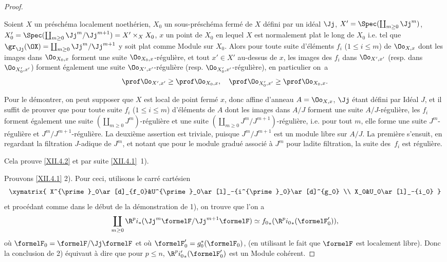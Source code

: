 \begin{proof}
\begin{lemme} \label{XII.4.2}
Soient $X$ un pr\'esch\'ema localement noeth\'erien, $X_0$ un sous-pr\'esch\'ema ferm\'e de $X$ d\'efini par un id\'eal $\Jj$, $X'=\Spec(\coprod_{m\geq 0} \Jj^m)$, $X_0'=\Spec(\coprod_{m\geq 0} \Jj^m/\Jj^{m+1}) = X'\times_XX_0$, $x$ un point de $X_0$ en lequel $X$ est normalement plat le long de $X_0$ i.e. tel que $\gr_{\Jj}(\OX)= \coprod_{m\geq 0}\Jj^m/\Jj^{m+1}$ y soit plat comme Module sur $X_0$. Alors pour toute suite d'\'el\'ements $f_i$ ($1\leq i\leq m$) de $\Oo_{X, x}$ dont les images dans $\Oo_{X_0, x}$ forment une suite $\Oo_{X_0, x}$-r\'eguli\`ere, et tout $x'\in X'$ au-dessus de $x$, les images des $f_i$ dans $\Oo_{X', x'}$ (resp. dans $\Oo_{X'_0, x'}$) forment \'egalement une suite $\Oo_{X', x'}$-r\'eguli\`ere (resp. $\Oo_{X'_0, x'}$-r\'eguli\`ere), en particulier on~a
\steco
\begin{equation} \label{eq:XII.23}
\prof \Oo_{X', x'} \geq \prof \Oo_{X_0, x}, \quad \prof \Oo_{X'_0, x'} \geq \prof \Oo_{X_0, x}.
\end{equation}
\end{lemme}

Pour le d\'emontrer, on peut supposer que $X$ est local de point ferm\'e $x$, donc affine d'anneau $A=\Oo_{X, x}$, $\Jj$ \'etant d\'efini par Id\'eal $J$, et il suffit de prouver que pour toute suite $f_i$ ($1\leq i\leq m$) d'\'el\'ements de $A$ dont les images dans $A/J$ forment une suite $A/J$-r\'eguli\`ere, les $f_i$ forment \'egalement une suite $(\coprod_{m\geq 0} J^m)$-r\'eguli\`ere et une suite $(\coprod_{m\geq 0} J^m/J^{m+1})$-r\'eguli\`ere, i.e. pour tout $m$, elle forme une suite $J^m$-r\'eguli\`ere et $J^m/J^{m+1}$-r\'eguli\`ere. La deuxi\`eme assertion est triviale, puisque $J^m/J^{m+1}$ est un module libre sur $A/J$. La premi\`ere s'ensuit, en regardant la filtration $J$-adique de $J^m$, et notant que pour le module gradu\'e associ\'e \`a $J^m$ pour ladite filtration, la suite des~$f_i$ est r\'eguli\`ere.

Cela prouve \ref{XII.4.2} et par suite \ref{XII.4.1}~1\noo).

Prouvons \ref{XII.4.1} 2\noo). Pour ceci, utilisons le carr\'e cart\'esien
\[
\xymatrix{
X^{\prime}_0\ar[d]_{f_0}&U^{\prime}_0\ar[l]_-{i^{\prime}_0}\ar[d]^{g_0} \\
X_0&U_0\ar[l]_-{i_0}
}
\]
et proc\'edant comme dans le d\'ebut de la d\'emonstration de 1\noo), on trouve que l'on a
\steco
\begin{equation} \label{eq:XII.24}
\coprod_{m\geq 0} \R^pi_\ast(\Jj^m\formelF/\Jj^{m+1}\formelF) \simeq {f_0}_\ast (\R^p{i_0}_\ast(\formelF_0')),
\end{equation}
o\`u $\formelF_0=\formelF/\Jj\formelF$ et o\`u $\formelF_0'=g_0^\ast(\formelF_0)$, (en utilisant le fait que $\formelF$ est localement libre). Donc la conclusion de 2\noo) \'equivaut \`a dire que pour $p\leq n$, $\R^p{i'_0}_\ast(\formelF_0')$ est un Module coh\'erent.


\end{proof}
